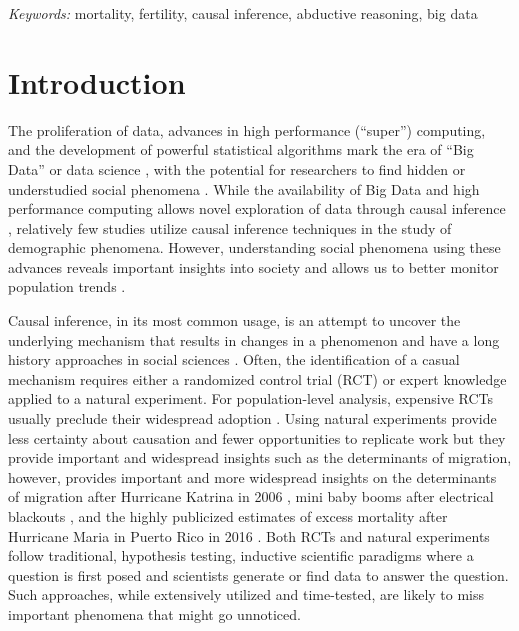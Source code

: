 \documentclass[12pt]{article}
\begin{document}
\noindent%
{\it Keywords:} mortality, fertility, causal inference, abductive reasoning, big data
\vfill

\newpage
{} %

\newpage

\hypertarget{introduction}{%
\section{Introduction}\label{introduction}}

The proliferation of data, advances in high performance (``super'')
computing, and the development of powerful statistical algorithms mark
the era of ``Big Data'' or data science
\citep{van2016data, zikopoulos2011}, with the potential for researchers
to find hidden or understudied social phenomena
\citep{bohon2018demography}. While the availability of Big Data and high
performance computing allows novel exploration of data through causal
inference
\citep{bohon2018demography, rcausalimpact, shiffrin2016drawing},
relatively few studies utilize causal inference techniques in the study
of demographic phenomena. However, understanding social phenomena using
these advances reveals important insights into society
\citep{angrist1989lifetime, mas2009peers} and allows us to better
monitor population trends \citep{nobles2019, torche2015hidden}.

Causal inference, in its most common usage, is an attempt to uncover the
underlying mechanism that results in changes in a phenomenon and have a
long history approaches in social sciences \citep{grimmer2015ppsp}.
Often, the identification of a casual mechanism requires either a
randomized control trial (RCT) or expert knowledge applied to a natural
experiment. For population-level analysis, expensive RCTs usually
preclude their widespread adoption \citep{west2008ajph}. Using natural
experiments provide less certainty about causation and fewer
opportunities to replicate work but they provide important and
widespread insights such as the determinants of migration, however,
provides important and more widespread insights on the determinants of
migration after Hurricane Katrina in 2006
\citep{fussellRecoveryMigrationCity2014, horiDisplacementDynamicsSouthern2009},
mini baby booms after electrical blackouts \citep{fetzer2018jpe}, and
the highly publicized estimates of excess mortality after Hurricane
Maria in Puerto Rico in 2016
\citep{kishore2018mortality, santos2018use}. Both RCTs and natural
experiments follow traditional, hypothesis testing, inductive scientific
paradigms where a question is first posed and scientists generate or
find data to answer the question. Such approaches, while extensively
utilized and time-tested, are likely to miss important phenomena that
might go unnoticed.
\end{document}
